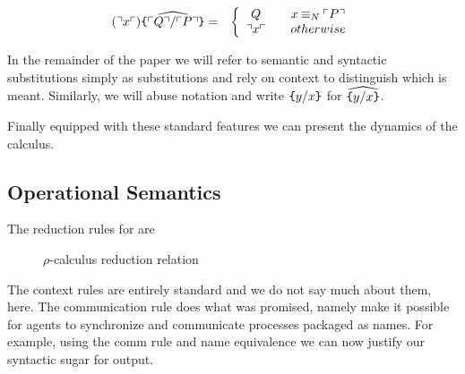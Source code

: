 \begin{eqnarray}
(\urcorner x \ulcorner)  \widehat{\texttt{\{} \ulcorner Q \urcorner / \ulcorner P \urcorner \texttt{\}}}       
		& = & 
		\left\{ 
			\begin{array}{ccc} 
				Q & & x \mathbin{\equiv_N} \ulcorner P \urcorner \\
                              	\urcorner x \ulcorner & & otherwise \\
			\end{array}
		\right. \nonumber
\end{eqnarray}

In the remainder of the paper we will refer to semantic and syntactic
substitutions simply as substitutions and rely on context to
distinguish which is meant. Similarly, we will abuse notation and
write $\texttt{\{} y / x \texttt{\}}$ for $\widehat{\texttt{\{} y / x \texttt{\}}}$.

Finally equipped with these standard features we can present the
dynamics of the calculus.

\subsection{Operational Semantics}
The reduction rules for {\rhoc}  are
\begin{figure}[hbp]
  \centering
  \caption{ $\rho$-calculus reduction relation }
\end{figure}




The context rules are entirely standard and we do not say much about
them, here. The communication rule does what was promised, namely make
it possible for agents to synchronize and communicate processes
packaged as names. For example, using the comm rule and name
equivalence we can now justify our syntactic sugar for output.

